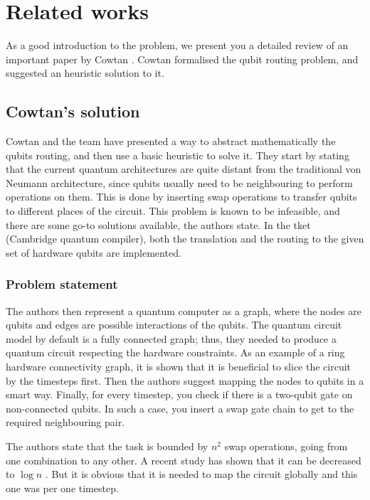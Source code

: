 \chapter{Related works}

As a good introduction to the problem, we present you a detailed review of an important paper by Cowtan \cite{cowtanQubitRoutingProblem2019}. Cowtan formalised the qubit routing problem, and suggested an heuristic solution to it. 

\section{Cowtan's solution}

Cowtan and the team have presented a way to abstract mathematically the qubits routing, and then use a basic heuristic to solve it. They start by stating that the current quantum architectures are quite distant from the traditional von Neumann architecture, since qubits usually need to be neighbouring to perform operations on them. This is done by inserting swap operations to transfer qubits to different places of the circuit. This problem is known to be infeasible, and there are some go-to solutions available, the authors state. In the tket (Cambridge quantum compiler), both the translation and the routing to the given set of hardware qubits are implemented. 

\subsection{Problem statement}

The authors then represent a quantum computer as a graph, where the nodes are qubits and edges are possible interactions of the qubits. The quantum circuit model by default is a fully connected graph; thus, they needed to produce a quantum circuit respecting the hardware constraints. As an example of a ring hardware connectivity graph, it is shown that it is beneficial to slice the circuit by the timesteps first. Then the authors suggest mapping the nodes to qubits in a smart way. Finally, for every timestep, you check if there is a two-qubit gate on non-connected qubits. In such a case, you insert a swap gate chain to get to the required neighbouring pair. 

The authors state that the task is bounded by  $n^2$ swap operations, going from one combination to any other. A recent study has shown that it can be decreased to $\log n$ \cite{herbertDepthOverheadIncurred2020}. 
But it is obvious that it is needed to map the circuit globally and this one was per one timestep. 

